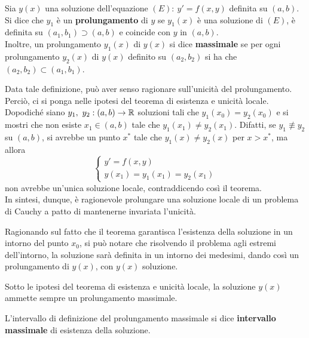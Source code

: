 \begin{definition} \label{Prolungamento}
    Sia $y(x)$ una soluzione dell'equazione $(E):\ y'=f(x,y)$ definita su $(a,b)$. Si dice che $y_1$ è un \textbf{prolungamento} di $y$ se $y_1(x)$ è una soluzione di $(E)$, è definita su $(a_1, b_1) \supset (a,b)$ e coincide con $y$ in $(a,b)$.\\
    Inoltre, un prolungamento $y_1(x)$ di $y(x)$ si dice \textbf{massimale} se per ogni prolungamento $y_2(x)$ di $y(x)$ definito su $(a_2, b_2)$ si ha che $(a_2, b_2) \subset (a_1, b_1)$.
\end{definition}
\begin{oss}
Data tale definizione, può aver senso ragionare sull'unicità del prolungamento. Perciò, ci si ponga nelle ipotesi del teorema di esistenza e unicità locale. Dopodiché siano $y_1,\ y_2 : (a,b) \to \mathbb{R}$ soluzioni tali che $y_1(x_0)=y_2(x_0)$ e si mostri che non esiste $x_1 \in (a,b)$ tale che $y_1(x_1) \neq y_2(x_1)$. Difatti, se $y_1 \not\equiv y_2$ su $(a,b)$, si avrebbe un punto $x^*$ tale che $y_1(x) \neq y_2(x)$ per $x>x^*$, ma allora
\begin{equation}
    \begin{cases}    
    y'=f(x,y)\\
    y(x_1)=y_1(x_1)=y_2(x_1)
    \end{cases}
\end{equation}
non avrebbe un'unica soluzione locale, contraddicendo così il teorema.\\
In sintesi, dunque, è ragionevole prolungare una soluzione locale di un problema di Cauchy a patto di mantenerne invariata l'unicità.
\end{oss}
Ragionando sul fatto che il teorema garantisca l'esistenza della soluzione in un intorno del punto $x_0$, si può notare che risolvendo il problema agli estremi dell'intorno, la soluzione sarà definita in un intorno dei medesimi, dando così un prolungamento di $y(x)$, con $y(x)$ soluzione. 
\begin{theorem}
    Sotto le ipotesi del teorema di esistenza e unicità locale, la soluzione $y(x)$ ammette sempre un prolungamento massimale.
\end{theorem}
\begin{definition}
    L'intervallo di definizione del prolungamento massimale si dice \textbf{intervallo massimale} di esistenza della soluzione.
\end{definition}

